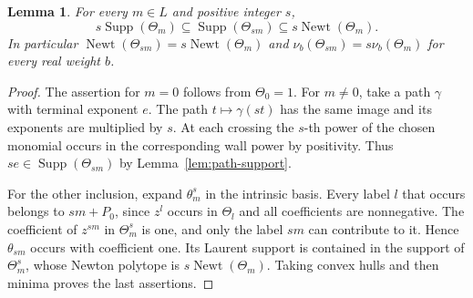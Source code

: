 \documentclass[11pt,reqno]{amsart}
\numberwithin{equation}{section}
\newtheorem{lemma}[theorem]{Lemma}
\theoremstyle{definition}
\theoremstyle{remark}
\DeclareMathOperator{\Newt}{Newt}
\DeclareMathOperator{\Supp}{Supp}
\begin{document}
\begin{lemma}\label{lem:local-support-dilation}
For every \(m\in L\) and positive integer \(s\),
\[ s\Supp(\Theta_m)\subseteq\Supp(\Theta_{sm})\subseteq s\Newt(\Theta_m). \]
In particular \(\Newt(\Theta_{sm})=s\Newt(\Theta_m)\) and
\(\nu_b(\Theta_{sm})=s\nu_b(\Theta_m)\) for every real weight \(b\).
\end{lemma}
\begin{proof}
The assertion for \(m=0\) follows from \(\Theta_0=1\).
For \(m\ne0\), take a path \(\gamma\) with terminal exponent \(e\).
The path \(t\mapsto\gamma(st)\) has the same image and its exponents
are multiplied by \(s\). At each crossing the \(s\)-th power of the
chosen monomial occurs in the corresponding wall power by positivity.
Thus \(se\in\Supp(\Theta_{sm})\) by Lemma~\ref{lem:path-support}.

For the other inclusion, expand \(\theta_m^s\) in the intrinsic basis.
Every label \(l\) that occurs belongs to \(sm+P_0\), since \(z^l\)
occurs in \(\Theta_l\) and all coefficients are nonnegative.
The coefficient of \(z^{sm}\) in \(\Theta_m^s\) is one, and only the
label \(sm\) can contribute to it. Hence \(\theta_{sm}\) occurs with
coefficient one. Its Laurent support is contained in the support of
\(\Theta_m^s\), whose Newton polytope is \(s\Newt(\Theta_m)\).
Taking convex hulls and then minima proves the last assertions.
\end{proof}
\end{document}
